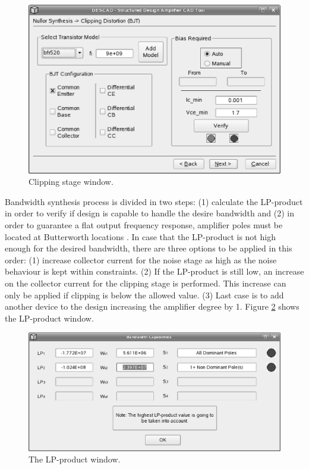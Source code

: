 \documentclass[twocolumn]{IEEEtran}
\begin{document}
\begin{figure}[hbtp]
	\centering
	\includegraphics[scale=0.3]{figures/wizard4.eps}
	\caption{Clipping stage window.}
	\label{fig:descad4}
\end{figure}

Bandwidth synthesis process is divided in two steps: (1) calculate the LP-product \cite{verhoeven} in order to verify if design is capable to handle the desire bandwidth and (2) in order to guarantee a flat output frequency response, amplifier poles must be located at Butterworth locations \cite{nordholt}. In case that the LP-product is not high enough for the desired bandwidth, there are three options to be applied in this order: (1) increase collector current for the noise stage as high as the noise behaviour is kept within constraints. (2) If the LP-product is still low, an increase on the collector current for the clipping stage is performed. This increase can only be applied if clipping is below the allowed value. (3) Last case is to add another device to the design increasing the amplifier degree by 1. Figure \ref{fig:descad5} shows the LP-product window.

\begin{figure}[hbtp]
	\centering
	\includegraphics[scale=0.3]{figures/wizard5.eps}
	\caption{The LP-product window.}
	\label{fig:descad5}
\end{figure}
\end{document}
